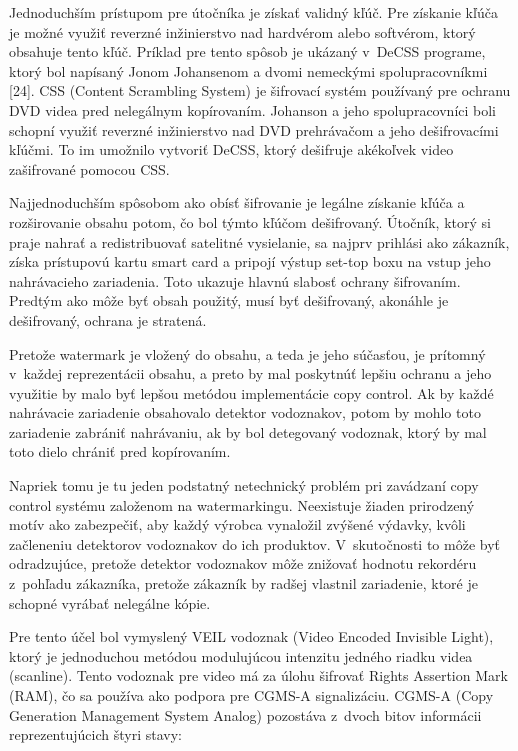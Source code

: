 Jednoduchším prístupom pre útočníka je získať validný kľúč. Pre získanie kľúča je možné využiť reverzné inžinierstvo nad hardvérom alebo softvérom, ktorý obsahuje tento kľúč. Príklad pre tento spôsob je ukázaný v~DeCSS programe, ktorý bol napísaný Jonom Johansenom a dvomi nemeckými spolupracovníkmi [24]. %
CSS (Content Scrambling System) je šifrovací systém používaný pre ochranu DVD videa pred nelegálnym kopírovaním. Johanson a jeho spolupracovníci boli schopní využiť reverzné inžinierstvo nad DVD prehrávačom a jeho dešifrovacími kľúčmi. To im umožnilo vytvoriť DeCSS, ktorý dešifruje akékoľvek video zašifrované pomocou CSS.

Najjednoduchším spôsobom ako obísť šifrovanie je legálne získanie kľúča a rozširovanie obsahu potom, čo bol týmto kľúčom dešifrovaný. Útočník, ktorý si praje nahrať a redistribuovať satelitné vysielanie, sa najprv prihlási ako zákazník, získa prístupovú kartu smart card a pripojí výstup set-top boxu na vstup jeho nahrávacieho zariadenia. Toto ukazuje hlavnú slabosť ochrany šifrovaním. Predtým ako môže byť obsah použitý, musí byť dešifrovaný, akonáhle je dešifrovaný, ochrana je stratená.

Pretože watermark je vložený do obsahu, a teda je jeho súčasťou, je prítomný v~každej reprezentácii obsahu, a preto by mal poskytnúť lepšiu ochranu a jeho využitie by malo byť lepšou metódou implementácie copy control. Ak by každé nahrávacie zariadenie obsahovalo detektor vodoznakov, potom by mohlo toto zariadenie zabrániť nahrávaniu, ak by bol detegovaný vodoznak, ktorý by mal toto dielo chrániť pred kopírovaním.

Napriek tomu je tu jeden podstatný netechnický problém pri zavádzaní copy control systému založenom na watermarkingu. Neexistuje žiaden prirodzený motív ako zabezpečiť, aby každý výrobca vynaložil zvýšené výdavky, kvôli začleneniu detektorov vodoznakov do ich produktov. V~skutočnosti to môže byť odradzujúce, pretože detektor vodoznakov môže znižovať hodnotu rekordéru z~pohľadu zákazníka, pretože zákazník by radšej vlastnil zariadenie, ktoré je schopné vyrábať nelegálne kópie.

Pre tento účel bol vymyslený VEIL vodoznak (Video Encoded Invisible Light), ktorý je jednoduchou metódou modulujúcou intenzitu jedného riadku videa (scanline). Tento vodoznak pre video má za úlohu šifrovať Rights Assertion Mark (RAM), čo sa používa ako podpora pre CGMS-A signalizáciu. CGMS-A (Copy Generation Management System Analog) pozostáva z~dvoch bitov informácii reprezentujúcich štyri stavy:

